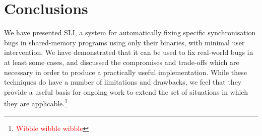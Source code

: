 \documentclass[10pt,twocolumn,preprint,natbib,authoryear]{sigplanconf}
\newcommand{\editorial}[1]{\textcolor{red}{\footnote{\textcolor{red}{#1}}}}
\begin{document}
\section{Conclusions}

We have presented SLI, a system for automatically fixing specific
synchronisation bugs in shared-memory programs using only their
binaries, with minimal user intervention.  We have demonstrated that
it can be used to fix real-world bugs in at least some cases, and
discussed the compromises and trade-offs which are necessary in order
to produce a practically useful implementation.  While these
techniques do have a number of limitations and drawbacks, we feel that
they provide a useful basis for ongoing work to extend the set of
situations in which they are applicable.\editorial{Wibble wibble
  wibble}



    
\end{document}
